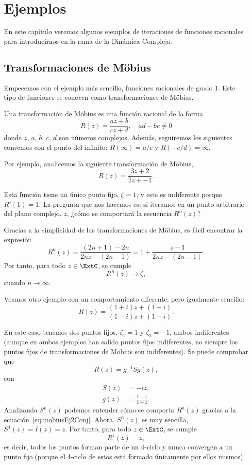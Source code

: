 \chapter{Ejemplos}
En este capítulo veremos algunos ejemplos de iteraciones de funciones racionales
para introducirnos en la rama de la Dinámica Compleja.

\section{Transformaciones de Möbius}
Empecemos con el ejemplo más sencillo, funciones racionales de grado 1. Este
tipo de funciones se conocen como transformaciones de Möbius.

\begin{definicion}
    Una transformación de Möbius es una función racional de la forma
    \[
        R(z) = \frac{az+b}{cz+d}, \quad ad-bc \ne 0
    \] 
    donde $z$, $a$, $b$, $c$, $d$ son números complejos. Además, seguiremos los
    siguientes convenios con el punto del infinito: $R(\infty)=a/c$ y
    $R(-c/d)= \infty$.
\end{definicion}

Por ejemplo, analicemos la siguiente transformación de Möbius,
\[
    R(z) = \frac{3z+2}{2z+-1}.
\]

Esta función tiene un único punto fijo, $\zeta = 1$, y este es indiferente
porque $R'(1) = 1$. La pregunta que nos hacemos es: si iteramos en un punto
arbitrario del plano complejo, $z$, ¿cómo se comportará la secuencia $R^n(z)$?

Gracias a la simplicidad de las transformaciones de Möbius, es fácil encontrar
la expresión
\[
    R^n(z) = \frac{(2n+1) -2n}{2nz-(2n-1)} =  1 + \frac{z-1}{2nz-(2n-1)}.
\]
Por tanto, para todo $z \in \ExtC$, se cumple
\[
    R^n(z) \to \zeta,
\]
cuando $n \to \infty$.

Veamos otro ejemplo con un comportamiento diferente, pero igualmente sencillo:
\[
    R(z) = \frac{(1+i)z + (1-i)}{(1-i)z + (1+i)}.
\]

En este caso tenemos dos puntos fijos, $\zeta_1 = 1$ y $\zeta_2 = -1$, ambos
indiferentes (aunque en ambos ejemplos han salido puntos fijos indiferentes, no
siempre los puntos fijos de transformaciones de Möbius son indiferentes). Se
puede comprobar que
\begin{equation}\label{eq:mobiusEj2Conj}
    R(z) = g^{-1}Sg(z),
\end{equation}
con
\begin{align*}
    S(z) &= -iz, \\
    g(z) &= \frac{1+z}{1-z}.
\end{align*}
Analizando $S^n(z)$ podemos entender cómo se comporta $R^n(z)$ gracias a la
ecuación~\ref{eq:mobiusEj2Conj}. Ahora, $S^n(z)$ es muy sencilla, $S^4(z) = I(z)
= z$. Por tanto, para todo $z \in \ExtC$, se cumple
\[
    R^4(z)=z,
\]
es decir, todos los puntos forman parte de un 4-ciclo y nunca convergen a un
punto fijo (porque el 4-ciclo de estos está formado únicamente por ellos
mismos).

